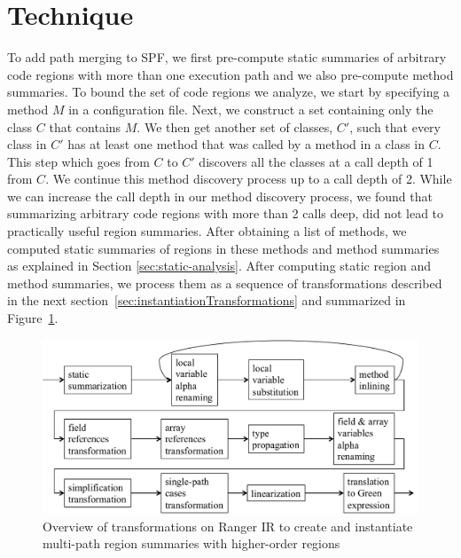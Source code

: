 \section{Technique}
%
To add path merging to SPF, we first pre-compute static summaries of arbitrary code regions with more than one execution
path and we also pre-compute method summaries.
%
To bound the set of code regions we analyze, we start by specifying a method $M$ in a configuration file.
%
Next, we construct a set containing only the class $C$ that contains $M$.
%
We then get another set of classes, $C'$,
such that every class in $C'$ has at least one method that was called by a method in a class in $C$.
%
This step which goes from $C$ to $C'$ discovers all the classes at a call depth of 1 from $C$.
%
We continue this method discovery process up to a call depth of 2.
%
While we can increase the call depth in our method discovery process, we found that summarizing
arbitrary code regions with more than 2 calls deep, did not lead to practically useful region summaries.
%
After obtaining a list of methods, we computed static summaries of regions in these methods and method summaries as
explained in Section \ref{sec:static-analysis}.
%
After computing static region and method summaries, we process them as a sequence of transformations described in the next section~\ref{sec:instantiationTransformations} and summarized
in Figure~\ref{fig:overview}.
%
\begin{figure}[]
    \caption{Overview of transformations on Ranger IR to create and instantiate multi-path region summaries with higher-order regions}
    \label{fig:overview}
    \includegraphics[width=\textwidth]{figures/overview.pdf}
\end{figure}
%
%
